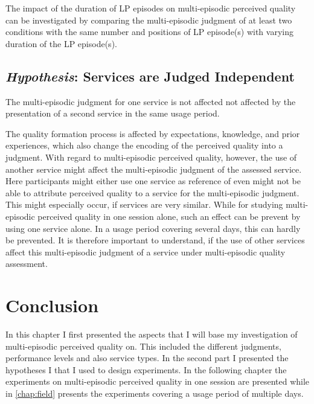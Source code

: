 The impact of the duration of \ac{LP} episodes on multi-episodic perceived quality can be investigated by comparing the multi-episodic judgment of at least two conditions with the same number and positions of \ac{LP} episode(s) with varying duration of the \ac{LP} episode(s).

\subsection{\emph{Hypothesis}: Services are Judged Independent}
\begin{hypothesis}\label{hypo:independent}
The multi-episodic judgment for one service is not affected not affected by the presentation of a second service in the same usage period.
\end{hypothesis}

The quality formation process is affected by expectations, knowledge, and prior experiences, which also change the encoding of the perceived quality into a judgment.
With regard to multi-episodic perceived quality, however, the use of another service might affect the multi-episodic judgment of the assessed service.
Here participants might either use one service as reference of even might not be able to attribute perceived quality to a service for the multi-episodic judgment.
This might especially occur, if services are very similar.
While for studying multi-episodic perceived quality in one session alone, such an effect can be prevent by using one service alone.
In a usage period covering several days, this can hardly be prevented.
It is therefore important to understand, if the use of other services affect this multi-episodic judgment of a service under multi-episodic quality assessment.

\section{Conclusion}
In this chapter I first presented the aspects that I will base my investigation of multi-episodic perceived quality on.
This included the different judgments, performance levels and also service types.
In the second part I presented the hypotheses I that I used to design experiments.
In the following chapter the experiments on multi-episodic perceived quality in one session are presented while in \autoref{chap:field} presents the experiments covering a usage period of multiple days.